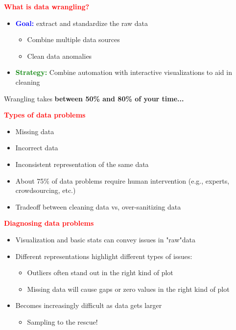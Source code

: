 \documentclass[11pt]{article}
\begin{document}
\vspace{0.5cm}

\textbf{\textcolor{red}{What is data wrangling?}}

\begin{itemize}
	\item \textbf{\textcolor{blue}{Goal:}} extract and standardize the raw data
	\begin{itemize}
		\item Combine multiple data sources
		\item Clean data anomalies
	\end{itemize}
	\item \textbf{\textcolor{green}{Strategy:}} Combine automation with interactive visualizations to aid in cleaning
\end{itemize}

Wrangling takes \textbf{between 50\% and 80\% of your time...}

\vspace{0.5cm}

\textbf{\textcolor{red}{Types of data problems}}

\begin{itemize}
	\item Missing data
	\item Incorrect data
	\item Inconsistent representation of the same data
	\item About 75\% of data problems require human intervention (e.g., experts, crowdsourcing, etc.)
	\item Tradeoff between cleaning data vs, over-sanitizing data
\end{itemize}

\vspace{0.5cm}

\textbf{\textcolor{red}{Diagnosing data problems}}

\begin{itemize}
	\item Visualization and basic stats can convey issues in "raw"data
	\item Different representations highlight different types of issues:
	\begin{itemize}
		\item Outliers often stand out in the right kind of plot
		\item Missing data will cause gaps or zero values in the right kind of plot
	\end{itemize}
	
	\item Becomes increasingly difficult as data gets larger
	\begin{itemize}
		\item Sampling to the rescue!
	\end{itemize}
\end{itemize}
\end{document}
